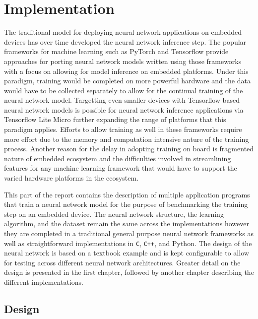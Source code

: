 \part{Implementation}

The traditional model for deploying neural network applications on embedded devices has over time developed the neural network inference step. The popular frameworks for machine learning such as PyTorch and Tensorflow provide approaches for porting neural network models written using those frameworks with a focus on allowing for model inference on embedded platforms. Under this paradigm, training would be completed on more powerful hardware and the data would have to be collected separately to allow for the continual training of the neural network model. Targetting even smaller devices with Tensorflow based neural network models is possible for neural network inference applications via Tensorflow Lite Micro \cite{tflm} further expanding the range of platforms that this paradigm applies. Efforts to allow training as well in these frameworks require more effort due to the memory and computation intensive nature of the training process. Another reason for the delay in adopting training on board is fragmented nature of embedded ecosystem and the difficulties involved in streamlining features for any machine learning framework that would have to support the varied hardware platforms in the ecosystem.

This part of the report contains the description of multiple application programs that train a neural network model for the purpose of benchmarking the training step on an embedded device. The neural network structure, the learning algorithm, and the dataset remain the same across the implementations however they are completed in a traditional general purpose neural network frameworks as well as straightforward implementations in \texttt{C}, \texttt{C++}, and Python. The design of the neural network is based on a textbook example and is kept configurable to allow for testing across different neural network architectures. Greater detail on the design is presented in the first chapter, followed by another chapter describing the different implementations.


\chapter{Design}

